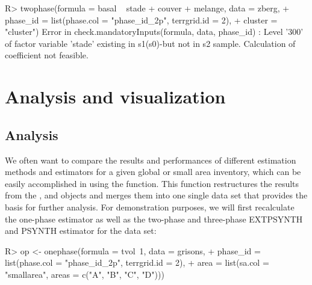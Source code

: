 \begin{small}
\begin{Schunk}
\begin{Sinput}
R> twophase(formula = basal ~ stade + couver + melange, data = zberg,
+    phase_id = list(phase.col = "phase_id_2p", terrgrid.id = 2),
+    cluster = "cluster")
Error in check.mandatoryInputs(formula, data, phase_id) : 
 Level '300' of factor variable 'stade' existing in s1(s0)-but not in s2 sample.
 Calculation of coefficient not feasible.
\end{Sinput}
\end{Schunk}
\end{small}


\newpage





\section{Analysis and visualization}
\label{sec:anal_and_vis}

\subsection{Analysis}

We often want to compare the results and performances of different estimation methods and estimators for a given global or small area inventory, which can be easily accomplished in  using the  function. This function restructures the results from the ,  and  objects and merges them into one single data set that provides the basis for further analysis. For demonstration purposes, we will first recalculate the one-phase estimator as well as the two-phase and three-phase EXTPSYNTH and PSYNTH estimator for the  data set:

\begin{small}
\begin{Schunk}
\begin{Sinput}
R> op <- onephase(formula = tvol~1, data = grisons,
+    phase_id = list(phase.col = "phase_id_2p", terrgrid.id = 2),
+    area = list(sa.col = "smallarea", areas = c("A", "B", "C", "D")))
\end{Sinput}
\end{Schunk}
\end{small}


